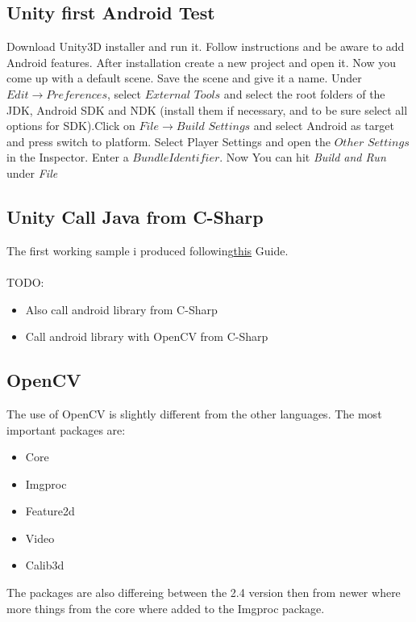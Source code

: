 \documentclass[10pt,a4paper]{article}
\begin{document}
\subsection{Unity first Android Test}
Download Unity3D installer and run it. Follow instructions and be aware to add Android features.
After installation create a new project and open it. Now you come up with a default scene. Save the scene and give it a name. Under $Edit \rightarrow Preferences$, select $External$ $Tools$ and select the root folders of the JDK, Android SDK and NDK (install them if necessary, and to be sure select all options for SDK).Click on $File \rightarrow Build$ $Settings$ and select Android as target and press switch to platform. Select Player Settings and open the $Other$ $Settings$ in the Inspector. Enter a $Bundle Identifier$. Now You can hit \textit{Build and Run} under \textit{File}

\subsection{Unity Call Java from C-Sharp}
The first working sample i produced following\href{https://www.thepolyglotdeveloper.com/2014/06/creating-an-android-java-plugin-for-unity3d/}{this} Guide.
\\\\
TODO:
\begin{itemize}
	\item Also call android library from C-Sharp
	\item Call android library with OpenCV from C-Sharp
\end{itemize}
\subsection{OpenCV}
The use of OpenCV is slightly different from the other languages. The most important packages are:
\begin{itemize}
	\item Core
	\item Imgproc
	\item Feature2d
	\item Video
	\item Calib3d
\end{itemize}
The packages are also differeing between the 2.4 version then from newer where more things from the core where added to the Imgproc package.
\end{document}
